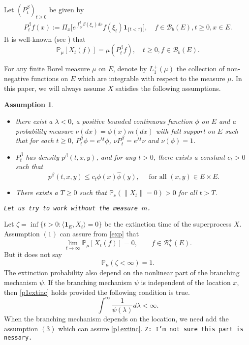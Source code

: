 \documentclass[12pt,a4paper]{amsart}
\numberwithin{equation}{section}
\theoremstyle{plain}
\newtheorem{assum}{Assumption}[section]
\theoremstyle{definition}
\theoremstyle{remark}
\begin{document}
	Let $(P_t^\beta)_{t\geq 0}$ be given by
\begin{align}
	P_t^\beta f(x)
	:= \Pi_x\Big[e^{\int_0^t \beta(\xi_r)dr }f(\xi_t) \mathbf 1_{\{t < \tau\}}\Big],
	\quad f\in \mathcal B_b(E), t\geq 0, x\in E.
\end{align}
	It is well-known (see \cite[Proposition 2.27]{Li2011MeasureValued}) that %
\begin{equation} \label{exp}
	\mathbb P_\mu[X_t(f)] = \mu (P_t^\beta f),
	\quad t\geq 0, f \in \mathcal B_b(E).
\end{equation}

	For any finite Borel measure $\mu$ on $E$, denote by $L_1^+(\mu)$ the collection of non-negative functions on $E$ which are integrable with respect to the measure $\mu$. %
In this paper, we will always assume $X$ satisfies the following assumptions.
\begin{assum}\label{assum}
\begin{itemize}
\item[(1)] there exist a $\lambda<0$, a positive bounded continuous function $\phi$ on $E$ and a probability measure $\nu(dx)=\hat\phi(x)m(dx)$ with full support on $E$ such that for each $t\geq 0$, $P_t^\beta \phi = e^{\lambda t}\phi$, $\nu P_t^\beta = e^{\lambda t} \nu$ and $\nu(\phi) = 1$.
\item[(2)] $P_t^\beta$ has density $p^\beta(t, x, y)$, and for any $t>0$, there exists
     a constant $c_t>0$ such that
    $$
    p^\beta(t, x, y)\le c_t\phi(x)\hat{\phi}(y), \quad \mbox{ for all }  (x, y)\in E\times E.
    $$
\item[(3)]There exists a $T\geq 0$ such that $\mathbb P_\nu(\|X_t\| = 0)>0$ for all $t> T$.
\end{itemize}
{\tt Let us try to work without the measure $m$.}
\end{assum}
Let  $\zeta=\inf\{t>0: \langle \mathbf 1_E,X_t\rangle=0\}$ be the extinction time of the superprocess $X$.  Assumption $(1)$ can assure from \eqref{exp} that
\[
\lim_{t\to\infty}\mathbb P_\mu[X_t(f)]=0, \qquad f \in \mathcal B_b^+(E).
\]
But it does not say
\begin{equation}\label{p1extinc}
	\mathbb P_\mu(\zeta<\infty)=1.
\end{equation}
The extinction probability also depend on the nonlinear part of the branching mechanism $\psi$. If the branching mechanism $\psi$ is independent of the location $x$, then \eqref{p1extinc} holds provided the following condition  is true.
\begin{equation}\label{extinc assump  for continuous}
	\int^\infty\frac{1}{\psi(\lambda)}d\lambda<\infty.
\end{equation}
When the branching mechanism depends on the location, we need add the assumption $(3)$ which can assure \eqref{p1extinc}. 
{\tt Z: I'm not sure this part is nessary.}
\end{document}
